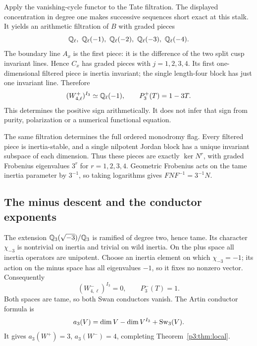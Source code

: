 Apply the vanishing-cycle functor to the Tate filtration. The displayed
concentration in degree one makes successive sequences short exact at this
stalk. It yields an arithmetic filtration of $B$ with graded pieces
\[
 \Q_\ell,\ \Q_\ell(-1),\ \Q_\ell(-2),\ \Q_\ell(-3),\ \Q_\ell(-4).
\]
The boundary line $A_x$ is the first piece: it is the difference of the
two split cusp invariant lines. Hence $C_x$ has graded pieces with
$j=1,2,3,4$. Its first one-dimensional filtered piece is inertia invariant;
the single length-four block has just one invariant line. Therefore
\[
 (W_{4,\ell}^{+})^{I_3}\simeq\mathbb Q_\ell(-1),\qquad P_3^+(T)=1-3T.
\]
This determines the positive sign arithmetically. It does not infer that
sign from purity, polarization or a numerical functional equation.

The same filtration determines the full ordered monodromy flag. Every
filtered piece is inertia-stable, and a single nilpotent Jordan block
has a unique invariant subspace of each dimension. Thus these pieces
are exactly $\ker N^r$, with graded Frobenius eigenvalues $3^r$ for
$r=1,2,3,4$. Geometric Frobenius acts on the tame inertia parameter by
$3^{-1}$, so taking logarithms gives $FNF^{-1}=3^{-1}N$.

\subsection{The minus descent and the conductor exponents}
The extension $\mathbb Q_3(\sqrt{-3})/\mathbb Q_3$ is ramified of degree two, hence tame.
Its character $\chi_{-3}$ is nontrivial on inertia and trivial on wild inertia.
On the plus space all inertia operators are unipotent. Choose an inertia
element on which $\chi_{-3}=-1$; its action on the minus space has all
eigenvalues $-1$, so it fixes no nonzero vector. Consequently
\[
 (W_{4,\ell}^{-})^{I_3}=0,\qquad P_3^-(T)=1.
\]
Both spaces are tame, so both Swan conductors vanish. The Artin conductor
formula \cite{Ulmer} is
\[
 a_3(V)=\dim V-\dim V^{I_3}+\operatorname{Sw}_3(V).
\]
It gives $a_3(W^+)=3$, $a_3(W^-)=4$, completing Theorem~\ref{p3:thm:local}.

